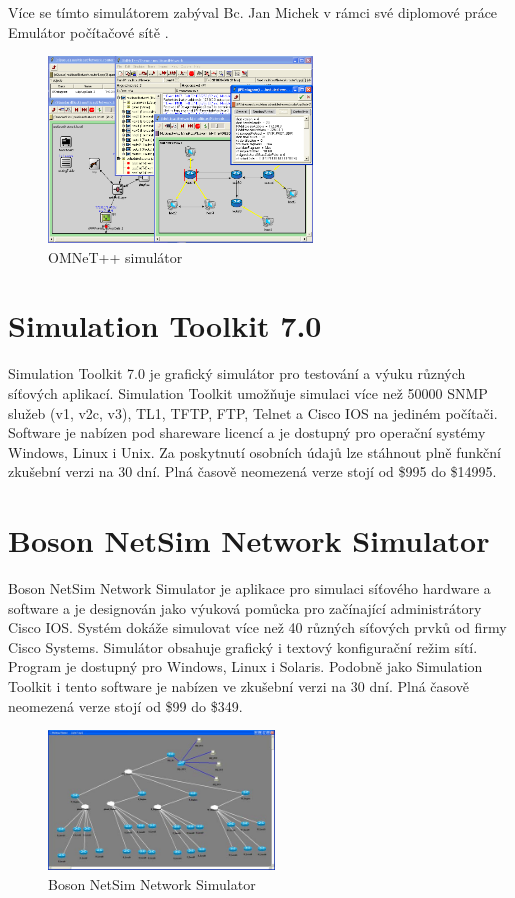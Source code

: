 Více se tímto simulátorem zabýval Bc. Jan Michek v rámci své diplomové práce Emulátor počítačové sítě \cite{reserse:omnet_dp}.

\begin{figure}[h]
\begin{center}
\includegraphics[width=7cm]{figures/r_omnet}
\caption{OMNeT++ simulátor}
\label{fig:r_omnet}
\end{center}
\end{figure}


\section{Simulation Toolkit 7.0} 
Simulation Toolkit 7.0 \cite{reserse:adventnet} je grafický simulátor pro testování a výuku různých síťových aplikací. Simulation Toolkit umožňuje simulaci více než 50000 SNMP služeb (v1, v2c, v3), TL1, TFTP, FTP, Telnet a Cisco IOS na jediném počítači. Software je nabízen pod shareware licencí a je dostupný pro operační systémy Windows, Linux i Unix. Za poskytnutí osobních údajů lze stáhnout plně funkční zkušební verzi na 30 dní. Plná časově neomezená verze stojí od \$995 do \$14995.


\section{Boson NetSim Network Simulator} 
Boson NetSim Network Simulator \cite{reserse:boson} je aplikace pro simulaci síťového hardware a software a je designován jako výuková pomůcka pro začínající administrátory Cisco IOS. Systém dokáže simulovat více než 40 různých síťových prvků od firmy Cisco Systems. Simulátor obsahuje grafický i textový konfigurační režim sítí. Program je dostupný pro Windows, Linux i Solaris. Podobně jako Simulation Toolkit i tento software je nabízen ve zkušební verzi na 30 dní. Plná časově neomezená verze stojí od \$99 do \$349.

\begin{figure}[h]
\begin{center}
\includegraphics[width=6cm]{figures/r_boson}
\caption{Boson NetSim Network Simulator}
\label{fig:r_boson}
\end{center}
\end{figure}

